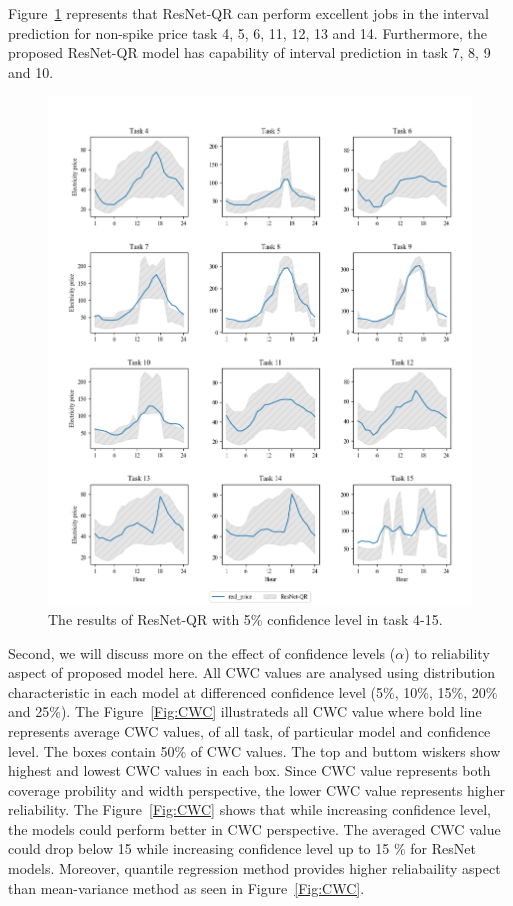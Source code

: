 \documentclass[review]{elsarticle}
\begin{document}
    Figure~\ref{Fig:all_task_QR_005} represents that ResNet-QR can perform excellent jobs in the interval prediction for non-spike price task 4, 5, 6, 11, 12, 13 and 14.
    Furthermore, the proposed ResNet-QR model has capability of interval prediction in task 7, 8, 9 and 10.
    \begin{figure}[H]
      \centering
      \includegraphics[width=15cm]{All_task_with_spike_price_QR_005}
      \caption{The results of ResNet-QR with 5$\%$ confidence level in task 4-15.}
      \label{Fig:all_task_QR_005}
    \end{figure}

    Second, we will discuss more on the effect of confidence levels ($\alpha$) to reliability aspect of proposed model here.
    All CWC values are analysed using distribution characteristic in each model at differenced confidence level (5$\%$, 10$\%$, 15$\%$, 20$\%$ and 25$\%$).
    The Figure~\ref{Fig:CWC} illustrateds all CWC value where bold line represents average CWC values, of all task, of particular model and confidence level.
    The boxes contain 50$\%$ of CWC values.
    The top and buttom wiskers show highest and lowest CWC values in each box.
    Since CWC value represents both coverage probility and width perspective, the lower CWC value represents higher reliability.
    The Figure~\ref{Fig:CWC} shows that while increasing confidence level, the models could perform better in CWC perspective.
    The averaged CWC value could drop below 15 while increasing confidence level up to 15 $\%$ for ResNet models.
    Moreover, quantile regression method provides higher reliabaility aspect than mean-variance method as seen in Figure~\ref{Fig:CWC}.
\end{document}
